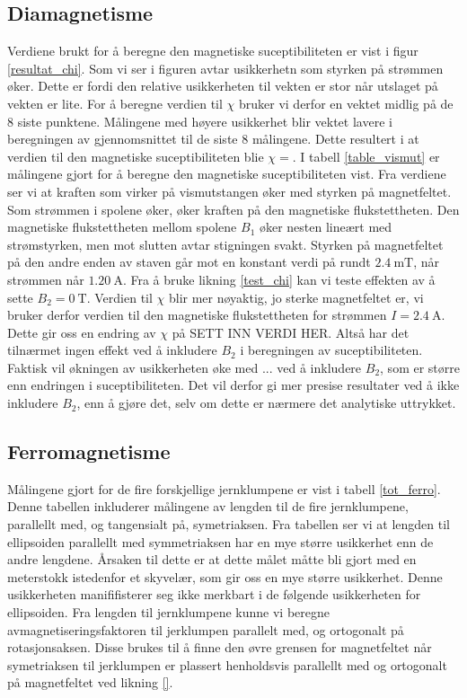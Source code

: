 \documentclass[%
 reprint,
 amsmath,amssymb,
 aps,
]{revtex4-1}
\begin{document}
\subsection{Diamagnetisme}
Verdiene brukt for å beregne den magnetiske suceptibiliteten er vist i figur \vref{resultat_chi}. Som vi ser i figuren avtar usikkerhetn som styrken på strømmen øker. Dette er fordi den relative usikkerheten til vekten er stor når utslaget på vekten er lite. For å beregne verdien til $\chi$ bruker vi derfor en vektet midlig på de $8$ siste punktene. Målingene med høyere usikkerhet blir vektet lavere i beregningen av gjennomsnittet til de siste $8$ målingene. Dette resultert i at verdien til den magnetiske suceptibiliteten blie $\chi =$.
I tabell \vref{table_vismut} er målingene gjort for å beregne den magnetiske suceptibiliteten vist. Fra verdiene ser vi at kraften som virker på vismutstangen øker med styrken på magnetfeltet. Som strømmen i spolene øker, øker kraften på den magnetiske flukstettheten. Den magnetiske flukstettheten mellom spolene $B_1$ øker nesten lineært med strømstyrken, men mot slutten avtar stigningen svakt. Styrken på magnetfeltet på den andre enden av staven går mot en konstant verdi på rundt $\SI{2.4}{\milli\tesla}$, når strømmen når $\SI{1.20}{\ampere}$. Fra å bruke likning \eqref{test_chi} kan vi teste effekten av å sette $B_2=\SI{0}{\tesla}$. Verdien til $\chi$ blir mer nøyaktig, jo sterke magnetfeltet er, vi bruker derfor verdien til den magnetiske flukstettheten for strømmen $I=\SI{2.4}{\ampere}$. Dette gir oss en endring av $\chi$ på SETT INN VERDI HER. Altså har det tilnærmet ingen effekt ved å inkludere $B_2$ i beregningen av suceptibiliteten. Faktisk vil økningen av usikkerheten øke med $...$ ved å inkludere $B_2$, som er større enn endringen i suceptibiliteten. Det vil derfor gi mer presise resultater ved å ikke inkludere $B_2$, enn å gjøre det, selv om dette er nærmere det analytiske uttrykket.
\subsection{Ferromagnetisme}
Målingene gjort for de fire forskjellige jernklumpene er vist i tabell \vref{tot_ferro}. Denne tabellen inkluderer målingene av lengden til de fire jernklumpene, parallellt med, og tangensialt på, symetriaksen.
Fra tabellen ser vi at lengden til ellipsoiden parallellt med symmetriaksen har en mye større usikkerhet enn de andre lengdene. Årsaken til dette er at dette målet måtte bli gjort med en meterstokk istedenfor et skyvelær, som gir oss en mye større usikkerhet. Denne usikkerheten manififisterer seg ikke merkbart i de følgende usikkerheten for ellipsoiden. Fra lengden til jernklumpene kunne vi beregne avmagnetiseringsfaktoren til jerklumpen parallelt med, og ortogonalt på rotasjonsaksen. Disse brukes til å finne den øvre grensen for magnetfeltet når symetriaksen til jerklumpen er plassert henholdsvis parallellt med og ortogonalt på magnetfeltet ved likning \eqref{}.
{}

\end{document}
